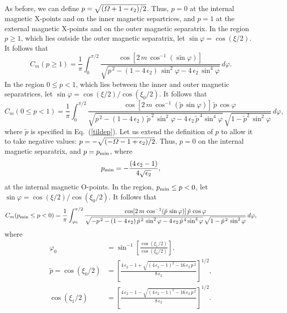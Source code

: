 \documentclass[12pt,prb,aps]{revtex4-1}
\begin{document}
As before, we can define $p=\sqrt{({\mit\Omega}+1-\epsilon_2)/2}$.  Thus, $p=0$ at the internal magnetic X-points and on the inner magnetic separtrices, and $p=1$ at the external
magnetic X-points and on the outer magnetic separatrix. In the region $p\geq1$, which lies outside the outer magnetic separatrix, let 
$\sin\varphi = \cos(\xi/2)$. 
It follows that 
\begin{equation}
 C_m(p\geq 1)=\frac{1}{\pi} \int_{0}^{\pi/2}\frac{\cos[2\,m\,\cos^{-1}(\sin\varphi)]}
 {\sqrt{p^{\,2}-(1-4\,\epsilon_2)\,\sin^2\varphi-4\,\epsilon_2\,\sin^4\varphi}}\,d\varphi.
\end{equation}
In the region $0\leq p< 1$, which lies between the inner and outer magnetic separatrices, let 
$\sin\varphi = \cos(\xi/2)/\cos(\xi_0/2)$.
 It follows that 
\begin{equation}
 C_m(0\leq p< 1)=\frac{1}{\pi} \int_{0}^{\pi/2}\frac{\cos[2\,m\,\cos^{-1}(\tilde{p}\,\sin\varphi)]\,\tilde{p}\,\cos\varphi}
 {\sqrt{p^{\,2}-(1-4\,\epsilon_2)\,\tilde{p}^{\,2}\,\sin^2\varphi-4\,\epsilon_2\,\tilde{p}^{\,4}\sin^4\varphi}\,\sqrt{1-\tilde{p}^2\,\sin^2\varphi}}\,d\varphi,
\end{equation}
where $\tilde{p}$ is specified in Eq.~(\ref{tildep}). 
Let us extend the definition of $p$ to allow it to take negative values: $p=-\sqrt{(-{\mit\Omega}-1+\epsilon_2)/2}$. Thus,
$p=0$ on the internal magnetic separatrix, and $p=p_{\rm min}$, 
where
\begin{equation}
p_{\rm min} = - \frac{(4\,\epsilon_2-1)}{4\sqrt{\epsilon_2}},
\end{equation}
at the internal magnetic O-points. In the region, $p_{\rm min}\leq p <0$, let $\sin\varphi = \cos(\xi/2)/\cos(\xi_0/2)$.  It follows that 
\begin{equation} C_m(p_{\rm min}\leq p< 0)=\frac{1}{\pi} \int_{\varphi_0}^{\pi/2}\frac{\cos[2\,m\,\cos^{-1}(\tilde{p}\,\sin\varphi)]\,\tilde{p}\,\cos\varphi}
 {\sqrt{-p^{\,2}-(1-4\,\epsilon_2)\,\tilde{p}^{\,2}\,\sin^2\varphi-4\,\epsilon_2\,\tilde{p}^{\,4}\sin^4\varphi}\,\sqrt{1-\tilde{p}^{\,2}\,\sin^2\varphi}}\,d\varphi,
\end{equation}
where  
\begin{align}
\varphi_0 &= \sin^{-1}\left[\frac{\cos(\xi_1/2)}{\cos(\xi_0/2)}\right],\\[0.5ex]
 \tilde{p}=\cos(\xi_0/2)& = \left[\frac{4\,\epsilon_2-1+\sqrt{(4\,\epsilon_2-1)^2-16\,\epsilon_2\,p^{\,2}}}{8\,\epsilon_2}\right]^{1/2},\\[0.5ex]
 \cos(\xi_1/2)& = \left[\frac{4\,\epsilon_2-1-\sqrt{(4\,\epsilon_2-1)^2-16\,\epsilon_2\,p^{\,2}}}{8\,\epsilon_2}\right]^{1/2}.
\end{align}
\end{document}
